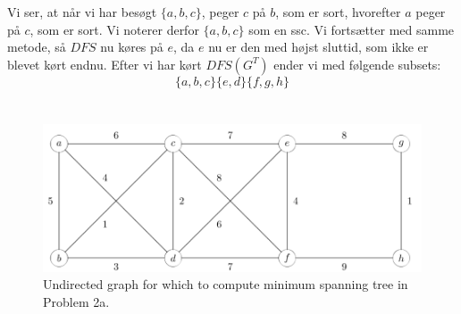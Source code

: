 \documentclass[a4paper,12pt]{article}
\begin{document}
Vi ser, at når vi har besøgt $\{a,b,c\}$, peger $c$ på $b$, som er sort, hvorefter $a$ peger på $c$, som er sort. Vi noterer derfor $\{a,b,c\}$ som en ssc. Vi fortsætter med samme metode, så $DFS$ nu køres på $e$, da $e$ nu er den med højst sluttid, som ikke er blevet kørt endnu. Efter vi har kørt $DFS(G^T)$ ender vi med følgende subsets:
\[\{a,b,c\} \{e,d\} \{f,g,h\}\]


\subsection[]{}



\section[Question 2]{}
\begin{figure}[H]
    \centering
    \includegraphics[width=1\textwidth]{2.png}
    \caption{Undirected graph for which to compute minimum spanning tree in Problem 2a.}
\end{figure}
\subsection[]{}
\end{document}
